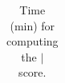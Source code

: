 {\begin{table}[htbp]
\begin{subtable}
{\begin{tabular}{|l|l|l|}
								\end{tabular} 
							}
											\caption{Time (min) for computing the $\mid$ score. 
												\label{table:LearningTime}}
						\end{subtable}
						
%										
%							
						
					\end{table}


}
